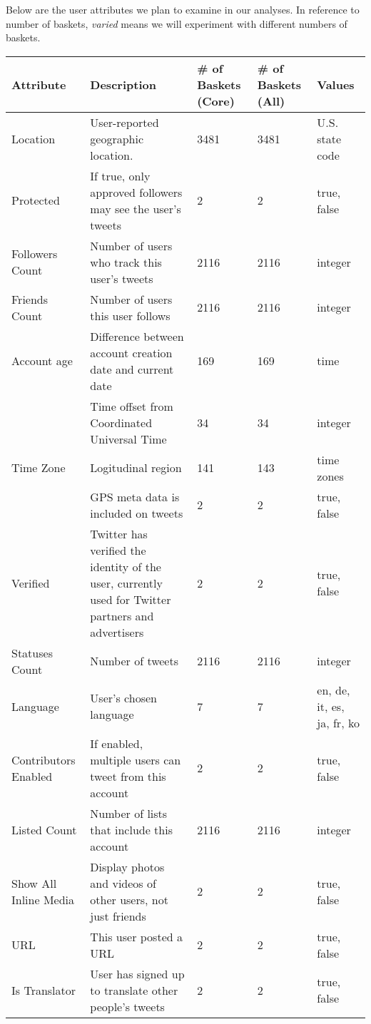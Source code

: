 Below are the user attributes we plan to examine in our analyses. In reference to number of baskets, \textit{varied} means we will experiment with different numbers of baskets.\\

\noindent \begin{tabular}[t]{| p{1in} | p{1.75in} | p{1in} | p{1in} | p{1.25in} |}
\hline
\textbf{Attribute} & \textbf{Description} & \textbf{\# of Baskets (Core)} & \textbf{\# of Baskets (All)} & \textbf{Values}  \\ \hline
Location & User-reported geographic location. & 3481 & 3481 & U.S. state code \\ \hline
Protected & If true, only approved followers may see the user's tweets & 2 & 2 & true, false \\ \hline
Followers Count & Number of users who track this user's tweets & 2116 & 2116 & integer \\ \hline
Friends Count & Number of users this user follows & 2116 & 2116 & integer \\ \hline
Account age & Difference between account creation date and current date & 169 & 169 & time \\ \hline
\begin{comment}
UTC Offset & Time offset from Coordinated Universal Time & 34 & 34 & integer \\ \hline
Time Zone & Logitudinal region & 141 & 143 & time zones  \\ \hline
\end{comment}
Geo-Enabled & GPS meta data is included on tweets & 2 & 2 & true, false \\ \hline
Verified & Twitter has verified the identity of the user, currently used for Twitter partners and advertisers & 2 & 2 & true, false \\ \hline
Statuses Count & Number of tweets & 2116 & 2116 & integer  \\ \hline
Language & User's chosen language & 7 & 7 & en, de, it, es, ja, fr, ko \\ \hline
Contributors Enabled & If enabled, multiple users can tweet from this account & 2 & 2 & true, false \\ \hline
Listed Count & Number of lists that include this account & 2116 & 2116 & integer \\ \hline
Show All Inline Media & Display photos and videos of other users, not just friends & 2 & 2 & true, false \\ \hline
URL & This user posted a URL & 2 & 2 & true, false \\ \hline
Is Translator & User has signed up to translate other people's tweets  & 2 & 2 & true, false \\ \hline
\end{tabular}